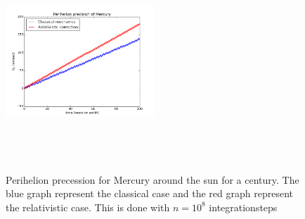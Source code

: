 \documentclass[%
 reprint,
 nobalance,
 amsmath,amssymb,
 aps,
]{revtex4-1}
\begin{document}
\begin{figure}[H]
\centering
\includegraphics[height=3.2in, width=0.5\textwidth]{plot/perihelion_precision.png} \caption{Perihelion precession for Mercury around the sun for a century. The blue graph represent the classical case and the red graph represent the relativistic case. This is done with $n=10^8$ integrationsteps}\label{fig:mercury_perPrec}
\end{figure}









\end{document}
